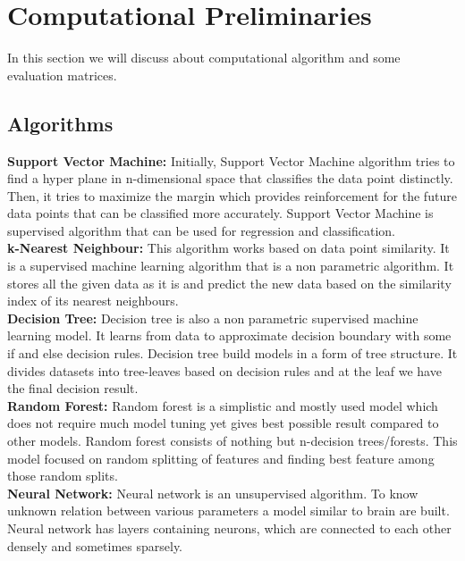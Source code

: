 \section{Computational Preliminaries}
\label{comp_pre}
In this section we will discuss about computational algorithm and some evaluation matrices.
\subsection{Algorithms}
\textbf{Support Vector Machine:} Initially, Support Vector Machine algorithm tries to find a hyper plane in n-dimensional space that classifies the data point distinctly. Then, it tries to maximize the margin which provides reinforcement for the future data points that can be classified more accurately. Support Vector Machine is supervised algorithm that can be used for regression and classification.\\[5pt]
\textbf{k-Nearest Neighbour:} This algorithm works based on data point similarity. It is a supervised machine learning algorithm that is a non parametric algorithm. It stores all the given data as it is and predict the new data based on the similarity index of its nearest neighbours.\\[5pt]
\textbf{Decision Tree:} Decision tree is also a non parametric supervised machine learning model. It learns from data to approximate decision boundary with some if and else decision rules. Decision tree build models in a form of tree structure. It divides datasets into tree-leaves based on decision rules and at the leaf we have the final decision result.\\[5pt]
\textbf{Random Forest:} Random forest is a simplistic and mostly used model which does not require much model tuning yet gives best possible result compared to other models. Random forest consists of nothing but n-decision trees/forests. This model focused on random splitting of features and finding best feature among those random splits.\\[5pt]
\textbf{Neural Network:} Neural network is an unsupervised algorithm. To know unknown relation between various parameters a model similar to brain are built. Neural network has layers containing neurons, which are connected to each other densely and sometimes sparsely.\\[5pt]
